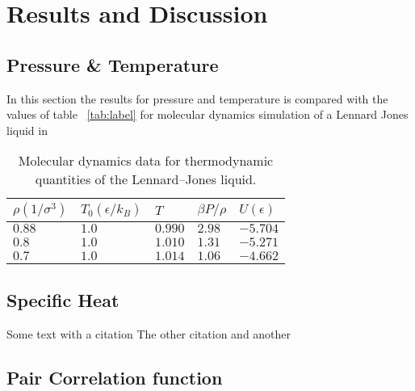 \documentclass[
10pt, %
a4paper, %
oneside, %
headinclude,footinclude, %
BCOR5mm, %
]{scrartcl}
\begin{document}
\section{Results and Discussion}

\subsection{Pressure \& Temperature}
In this section the results for pressure and temperature is compared with the values of table ~\vref{tab:label} for molecular dynamics simulation of a Lennard Jones liquid in \cite{Thijssen:2013cp}

\begin{table}[hbt]
\caption{Molecular dynamics data for thermodynamic quantities of the Lennard–Jones liquid.}
\centering
\begin{tabular}{lllll}
\toprule
\toprule
$\rho(1/\sigma^3)$ & $T_0(\epsilon/k_B)$ & $T$ & $\beta P/\rho$ & $U(\epsilon)$ \\
\midrule
$0.88$ & $1.0$ & $0.990$ & $2.98$ & $-5.704$ \\
$0.8$ & $1.0$ & $1.010$ & $1.31$ & $-5.271$ \\
$0.7$ & $1.0$ & $1.014$ & $1.06$ & $-4.662$ \\
\bottomrule
\bottomrule
\end{tabular}
\label{tab:label}
\end{table}



\subsection{Specific Heat}




Some text with a citation \cite{Verlet:1967md}
The other citation \cite{Glosser:2015iccp} and another\cite{Thijssen:2013cp}


\subsection{Pair Correlation function}
\end{document}

